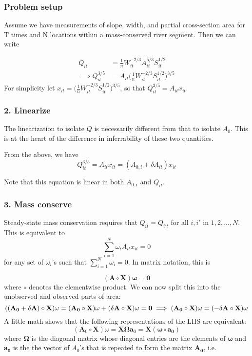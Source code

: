 \documentclass[]{article}
\title{}
\author{}
\date{}
\begin{document}
\subsubsection{Problem setup}\label{problem-setup}

Assume we have measurements of slope, width, and partial cross-section
area for T times and N locations within a mass-conserved river segment.
Then we can write

\[
\begin{aligned}
Q_{it} &= \frac{1}{n} W_{it}^{-2/3} A_{it}^{5/3}S_{it}^{1/2} \\
\implies Q^{3/5}_{it} & = A_{it}\Big(\frac{1}{n} W_{it}^{-2/3} S_{it}^{1/2} \Big)^{3/5}
\end{aligned}
\] For simplicity let
\(x_{it} = \Big(\frac{1}{n} W_{it}^{-2/3} S_{it}^{1/2} \Big)^{3/5}\), so
that \(Q^{3/5}_{it} = A_{it}x_{it}\).

\subsubsection{2. Linearize}\label{linearize}

The linearization to isolate \(Q\) is necessarily different from that to
isolate \(A_0\). This is at the heart of the difference in inferrability
of these two quantities.

From the above, we have \[
Q^{3/5}_{it} = A_{it}x_{it} = (A_{0,i} + \delta A_{it}) x_{it}
\]

Note that this equation is linear in both \(A_{0,i}\) and \(Q_{it}\).

\subsubsection{3. Mass conserve}\label{mass-conserve}

Steady-state mass conservation requires that \(Q_{it} = Q_{i't}\) for
all \(i, i'\) in \(1, 2, ..., N\). This is equivalent to\\
\[
\sum_{i = 1}^N\omega_i A_{it} x_{it} = 0
\] for any set of \(\omega_i\)'s such that
\(\sum_{i = 1}^N \omega_i = 0\). In matrix notation, this is

\[
(\mathbf{A} \circ \mathbf{X}) \mathbf{\omega} = \mathbf{0}
\] where \(\circ\) denotes the elementwise product. We can now split
this into the unobserved and observed parts of area: \[
((\mathbf{A_0} + \mathbf{\delta A}) \circ \mathbf{X}) \mathbf{\omega} = (\mathbf{A_0} \circ \mathbf{X}) \omega + (\mathbf{\delta A} \circ \mathbf{X}) \mathbf{\omega} =  \mathbf{0} \\
\implies (\mathbf{A_0} \circ \mathbf{X}) \omega = (-\delta \mathbf{A} \circ \mathbf{X}) \omega
\] A little math shows that the following representations of the LHS are
equivalent: \[
(\mathbf{A}_0 \circ \mathbf{X}) \omega = \mathbf{X} \mathbf{\Omega} \mathbf{a}_0 = \mathbf{X} (\mathbf{\omega} \circ \mathbf{a_0})
\] where \(\mathbf{\Omega}\) is the diagonal matrix whose diagonal
entries are the elements of \(\mathbf{\omega}\) and \(\mathbf{a_0}\) is
the the vector of \(A_0\)'s that is repeated to form the matrix
\(\mathbf{A_0}\), i.e.
\end{document}
